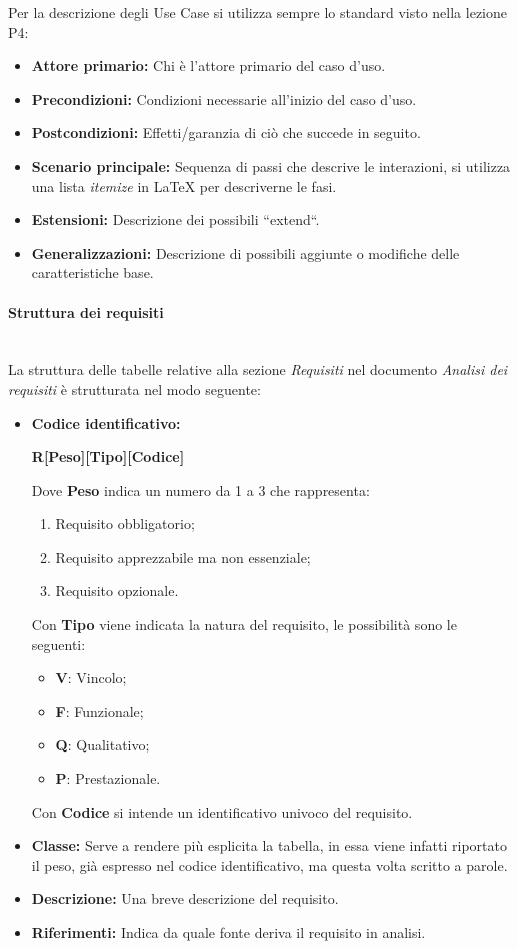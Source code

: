 \noindent Per la descrizione degli Use Case si utilizza sempre lo standard visto nella lezione P4:
\begin{itemize}
	\item \textbf{Attore primario:} Chi è l'attore primario del caso d'uso.
	\item \textbf{Precondizioni:} Condizioni necessarie all'inizio del caso d'uso.
	\item \textbf{Postcondizioni:} Effetti/garanzia di ciò che succede in seguito.
	\item \textbf{Scenario principale:} Sequenza di passi che descrive le interazioni, si utilizza una lista \textit{itemize} in LaTeX per descriverne le fasi.
	\item \textbf{Estensioni:} Descrizione dei possibili ``extend``.
	\item \textbf{Generalizzazioni:} Descrizione di possibili aggiunte o modifiche delle caratteristiche base.
\end{itemize}


\paragraph{Struttura dei requisiti}
\mbox{} \\
La struttura delle tabelle relative alla sezione \textit{Requisiti} nel documento \textit{Analisi dei requisiti} è strutturata nel modo seguente:
\begin{itemize}
    \item   \textbf{Codice identificativo:}
            \par \centerline{\textbf{R[Peso][Tipo][Codice]}}
            Dove \textbf{Peso} indica un numero da 1 a 3 che rappresenta:
            \begin{enumerate}
                \item Requisito obbligatorio;
                \item Requisito apprezzabile ma non essenziale;
                \item Requisito opzionale.
            \end{enumerate}
            Con \textbf{Tipo} viene indicata la natura del requisito, le possibilità sono le seguenti:
            \begin{itemize}
                \item \textbf{V}: Vincolo;
                \item \textbf{F}: Funzionale;
                \item \textbf{Q}: Qualitativo;
                \item \textbf{P}: Prestazionale.
            \end{itemize}
            Con \textbf{Codice} si intende un identificativo univoco del requisito.
    \item \textbf{Classe:} Serve a rendere più esplicita la tabella, in essa viene infatti riportato il peso, già espresso nel codice identificativo, ma questa volta scritto a parole.
    \item \textbf{Descrizione:} Una breve descrizione del requisito.
    \item \textbf{Riferimenti:} Indica da quale fonte deriva il requisito in analisi.   
\end{itemize}

